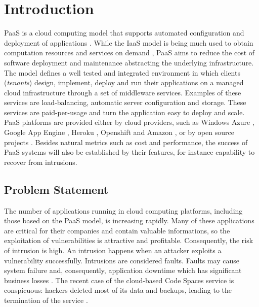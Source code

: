 \chapter{Introduction}\label{chapter:introduction}
\ac{PaaS} is a cloud computing model that supports automated configuration and deployment of applications \cite{Vaquero2008,Vaquero2011,Armbrust,Mell}. While the \ac{IaaS} model is being much used to obtain computation resources and services on demand \cite{Lenk2009,Armbrust2009}, \ac{PaaS} aims to reduce the cost of software deployment and maintenance abstracting the underlying infrastructure. The model defines a well tested and integrated environment in which clients (\textit{tenants}) design, implement, deploy and run their applications on a managed cloud infrastructure through a set of middleware services. Examples of these services are load-balancing, automatic server configuration and storage. These services are paid-per-usage and turn the application easy to deploy and scale.
\ac{PaaS} platforms are provided either by cloud providers, such as Windows Azure \cite{azure}, Google App Engine \cite{GoogleAppEngine}, Heroku \cite{Heroku}, Openshift \cite{OpenShift} and Amazon \cite{AmazonElasticBeanstalk}, or by open source projects \cite{Appscale,Cloudfoundry,ApacheStratos}. Besides natural metrics such as cost and performance, the success of \ac{PaaS} systems will also be established by their features, for instance capability to recover from intrusions.


\section{Problem Statement}\label{sec:introduction:problem}
The number of applications running in cloud computing platforms, including those based on the \ac{PaaS} model, is increasing rapidly. 
Many of these applications are critical for their companies and contain valuable informations, so the exploitation of vulnerabilities is attractive and profitable. Consequently, the risk of intrusion is high. An intrusion happens when an attacker exploits a vulnerability successfully. Intrusions are considered faults. Faults may cause system failure and, consequently, application downtime which has significant business losses \cite{Patterson2002a}. The recent case of the cloud-based Code Spaces service is conspicuous: hackers deleted most of its data and backups, leading to the termination of the service \cite{McAllister:14}. 


